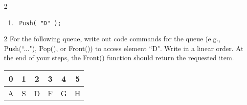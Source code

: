 \documentclass[a4paper,12pt,oneside]{book}
\newcounter{question}
\begin{document}
\begin{question}{\thequestion}{2}
\begin{enumerate}
                \item   \begin{verbatim} Push( "D" ); \end{verbatim}
                
            \end{enumerate}
        \end{question}

        \begin{question}{\thequestion}{2}
            For the following queue, write out code commands for the queue
            (e.g., Push(``..."), Pop(), or Front()) to access element ``D". Write in a linear
            order. At the end of your steps, the Front() function should return
            the requested item.

            \begin{center}
                \begin{tabular}{ | c | c | c | c | c | c | }
                    \hline
                    0 & 1 & 2 & 3 & 4 & 5
                    \\ \hline
                    A & S & D & F & G & H
                    \\ \hline
                \end{tabular}
            \end{center}

        \end{question}
\end{document}
